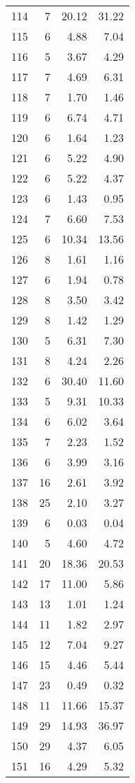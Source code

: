 \begin{longtable}{c r r r}
  114 & 7  & 20.12 & 31.22 \\ 
  115 & 6  & 4.88 & 7.04 \\ 
  116 & 5  & 3.67 & 4.29 \\ 
  117 & 7  & 4.69 & 6.31 \\ 
  118 & 7  & 1.70 & 1.46 \\ 
  119 & 6  & 6.74 & 4.71 \\ 
  120 & 6  & 1.64 & 1.23 \\ 
  121 & 6  & 5.22 & 4.90 \\ 
  122 & 6  & 5.22 & 4.37 \\ 
  123 & 6  & 1.43 & 0.95 \\ 
  124 & 7  & 6.60 & 7.53 \\ 
  125 & 6  & 10.34 & 13.56 \\ 
  126 & 8  & 1.61 & 1.16 \\ 
  127 & 6  & 1.94 & 0.78 \\ 
  128 & 8  & 3.50 & 3.42 \\ 
  129 & 8  & 1.42 & 1.29 \\ 
  130 & 5  & 6.31 & 7.30 \\ 
  131 & 8  & 4.24 & 2.26 \\ 
  132 & 6  & 30.40 & 11.60 \\ 
  133 & 5  & 9.31 & 10.33 \\ 
  134 & 6  & 6.02 & 3.64 \\ 
  135 & 7  & 2.23 & 1.52 \\ 
  136 & 6  & 3.99 & 3.16 \\ 
  137 & 16  & 2.61 & 3.92 \\ 
  138 & 25  & 2.10 & 3.27 \\ 
  139 & 6  & 0.03 & 0.04 \\ 
  140 & 5  & 4.60 & 4.72 \\ 
  141 & 20  & 18.36 & 20.53 \\ 
  142 & 17  & 11.00 & 5.86 \\ 
  143 & 13  & 1.01 & 1.24 \\ 
  144 & 11  & 1.82 & 2.97 \\ 
  145 & 12  & 7.04 & 9.27 \\ 
  146 & 15  & 4.46 & 5.44 \\ 
  147 & 23  & 0.49 & 0.32 \\ 
  148 & 11  & 11.66 & 15.37 \\ 
  149 & 29  & 14.93 & 36.97 \\ 
  150 & 29  & 4.37 & 6.05 \\ 
  151 & 16  & 4.29 & 5.32 \\ 

\end{longtable}
